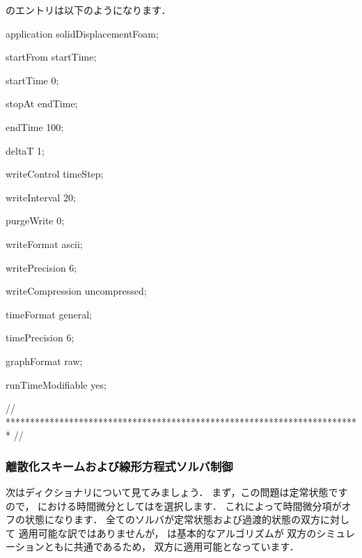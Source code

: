 %
%
のエントリは以下のようになります．
\begin{OFverbatim}[file, linenum=17]

application     solidDisplacementFoam;

startFrom       startTime;

startTime       0;

stopAt          endTime;

endTime         100;

deltaT          1;

writeControl    timeStep;

writeInterval   20;

purgeWrite      0;

writeFormat     ascii;

writePrecision  6;

writeCompression uncompressed;

timeFormat      general;

timePrecision   6;

graphFormat     raw;

runTimeModifiable yes;


// ************************************************************************* //
\end{OFverbatim}

\subsubsection{離散化スキームおよび線形方程式ソルバ制御}
\label{sssec:2.2.1.5}
次はディクショナリについて見てみましょう．
まず，この問題は定常状態ですので，
における時間微分としてはを選択します．
これによって時間微分項がオフの状態になります．
全てのソルバが定常状態および過渡的状態の双方に対して
適用可能な訳ではありませんが，
は基本的なアルゴリズムが
双方のシミュレーションともに共通であるため，
双方に適用可能となっています．

